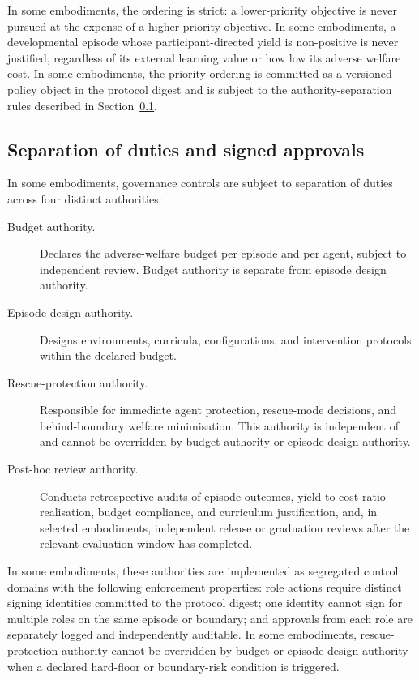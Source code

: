 \documentclass[a4paper,12pt]{article}
\begin{document}
In some embodiments, the ordering is strict: a lower-priority
objective is never pursued at the expense of a higher-priority
objective. In some embodiments, a developmental episode whose
participant-directed yield is non-positive is never justified,
regardless of its external learning value or how low its adverse
welfare cost. In some embodiments, the priority ordering is committed
as a versioned policy object in the protocol digest and is subject to
the authority-separation rules described in
Section~\ref{sec:authority-separation}.

\subsection{Separation of duties and signed approvals}
\label{sec:authority-separation}

In some embodiments, governance controls are subject to separation of
duties across four distinct authorities:

\begin{description}
  \item[Budget authority.] Declares the adverse-welfare budget per
    episode and per agent, subject to independent review. Budget
    authority is separate from episode design authority.
  \item[Episode-design authority.] Designs environments, curricula,
    configurations, and intervention protocols within the declared
    budget.
  \item[Rescue-protection authority.] Responsible for immediate agent
    protection, rescue-mode decisions, and behind-boundary welfare
    minimisation. This authority is independent of and cannot be
    overridden by budget authority or episode-design authority.
  \item[Post-hoc review authority.] Conducts retrospective audits
    of episode outcomes, yield-to-cost ratio realisation, budget
    compliance, and curriculum justification, and, in selected
    embodiments, independent release or graduation reviews after the
    relevant evaluation window has completed.
\end{description}

In some embodiments, these authorities are implemented as segregated
control domains with the following enforcement properties: role actions
require distinct signing identities committed to the protocol digest;
one identity cannot sign for multiple roles on the same episode or
boundary; and approvals from each role are separately logged and
independently auditable. In some embodiments, rescue-protection
authority cannot be overridden by budget or episode-design authority
when a declared hard-floor or boundary-risk condition is triggered.
\end{document}
